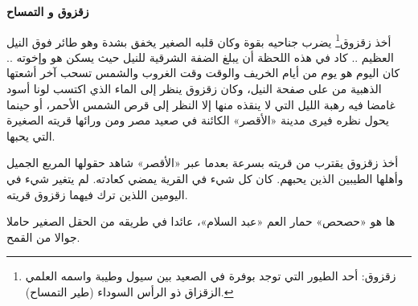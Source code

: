 \documentclass[12pt]{article}
\newcommand{\TextOnlyPage}[1]{%
  \clearpage
  \thispagestyle{empty}
  \vspace*{2mm}
  #1
  \clearpage
}
\begin{document}

\TextOnlyPage{%
  \begin{center}
    {\Large\bfseries زقزوق و التمساح}
  \end{center}

  \vspace{1.4cm}

  أخذ زقزوق\footnote{زقزوق: أحد الطيور التي توجد بوفرة في الصعيد بين سيول وطيبة واسمه العلمي الزقزاق ذو الرأس السوداء (طير التمساح).} يضرب جناحيه بقوة وكان قلبه الصغير يخفق بشدة وهو طائر فوق النيل العظيم .. كاد في هذه اللحظة أن يبلغ الضفة الشرقية للنيل حيث يسكن هو وإخوته .. كان اليوم هو يوم من أيام الخريف والوقت وقت الغروب والشمس تسحب آخر أشعتها الذهبية من على صفحة النيل، وكان زقزوق ينظر إلى الماء الذي اكتسب لونا أسود غامضا فيه رهبة الليل التي لا ينقذه منها إلا النظر إلى قرص الشمس الأحمر، أو حينما يحول نظره فيرى مدينة «الأقصر» الكائنة في صعيد مصر ومن ورائها قريته الصغيرة التي يحبها.

  أخذ زقزوق يقترب من قريته بسرعة بعدما عبر «الأقصر» شاهد حقولها المربع الجميل وأهلها الطيبين الذين يحبهم. كان كل شيء في القرية يمضي كعادته. لم يتغير شيء في اليومين اللذين ترك فيهما زقزوق قريته.

  ها هو «حصحص» حمار العم «عبد السلام»، عائدا في طريقه من الحقل الصغير حاملا جوالا من القمح.
}
\end{document}
